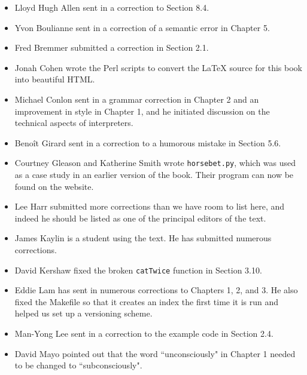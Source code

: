 \documentclass[10pt]{book}
\begin{document}
\begin{itemize}

\small
\item Lloyd Hugh Allen sent in a correction to Section 8.4.

\item Yvon Boulianne sent in a correction of a semantic error in
Chapter 5.

\item Fred Bremmer submitted a correction in Section 2.1.

\item Jonah Cohen wrote the Perl scripts to convert the
LaTeX source for this book into beautiful HTML.

\item Michael Conlon sent in a grammar correction in Chapter 2
and an improvement in style in Chapter 1, and he initiated discussion
on the technical aspects of interpreters.

\item Beno\^{i}t Girard sent in a
correction to a humorous mistake in Section 5.6.

\item Courtney Gleason and Katherine Smith wrote {\tt horsebet.py},
which was used as a case study in an earlier version of the book.  Their
program can now be found on the website.

\item Lee Harr submitted more corrections than we have room to list
here, and indeed he should be listed as one of the principal editors
of the text.

\item James Kaylin is a student using the text. He has submitted
numerous corrections.

\item David Kershaw fixed the broken {\tt catTwice} function in Section
3.10.

\item Eddie Lam has sent in numerous corrections to Chapters 
1, 2, and 3.
He also fixed the Makefile so that it creates an index the first time it is
run and helped us set up a versioning scheme.  

\item Man-Yong Lee sent in a correction to the example code in
Section 2.4.  

\item David Mayo pointed out that the word ``unconsciously"
in Chapter 1 needed
to be changed to ``subconsciously".


\end{itemize}
\end{document}
